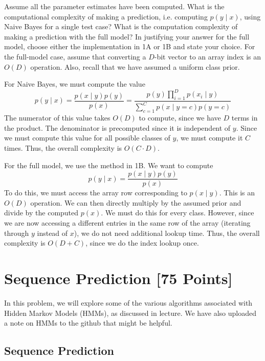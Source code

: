 \newpage

\problem[8 EC] Assume all the parameter estimates have been computed. What is the computational complexity of making a prediction, i.e. computing $p(y \mid x)$, using Naive Bayes for a single test case? What is the computation complexity of making a prediction with the full model? In justifying your answer for the full model, choose either the implementation in 1A or 1B and state your choice. For the full-model case, assume that converting a $D$-bit vector to an array index is an $O(D)$ operation.  Also, recall that we have assumed a uniform class prior. 

\begin{solution}
    For Naive Bayes, we must compute the value
    \[
        p(y \mid x) = \frac{p(x \mid y) p(y)}{p(x)} = \frac{p(y) \prod_{i=1}^D p(x_i \mid y)}{\sum_{c=1}^C p(x \mid y=c) p(y=c)}
    \]
    The numerator of this value takes $O(D)$ to compute, since we have $D$ terms in the product. The denominator is precomputed since it is independent of $y$. Since we must compute this value for all possible classes of $y$, we must compute it $C$ times. Thus, the overall complexity is $O(C \cdot D)$.

    For the full model, we use the method in 1B. We want to compute
    \[
        p(y \mid x) = \frac{p(x \mid y) p(y)}{p(x)}
    \]
    To do this, we must access the array row corresponding to $p(x \mid y)$. This is an $O(D)$ operation. We can then directly multiply by the assumed prior and divide by the computed $p(x)$. We must do this for every class. However, since we are now accessing a different entries in the same row of the array (iterating through $y$ instead of $x$), we do not need additional lookup time. Thus, the overall complexity is $O(D + C)$, since we do the index lookup once.
\end{solution}


\newpage
\section{Sequence Prediction [75 Points]}

In this problem, we will explore some of the various algorithms associated with Hidden Markov Models (HMMs), as discussed in lecture.
We have also uploaded a note on HMMs to the github that might be helpful.

\subsection{Sequence Prediction}

